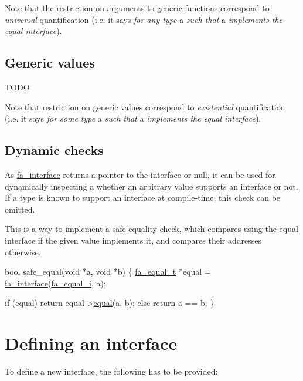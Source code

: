 Note that the restriction on arguments to generic functions correspond to {\itshape universal} quantification (i.\-e. it says {\itshape for any type} a {\itshape such that} a {\itshape implements the equal interface}).\hypertarget{md__interfaces_GenericPointers}{}\subsection{Generic values}\label{md__interfaces_GenericPointers}
T\-O\-D\-O

Note that restriction on generic values correspond to {\itshape existential} quantification (i.\-e. it says {\itshape for some type} a {\itshape such that} a {\itshape implements the equal interface}).\hypertarget{md__interfaces_DynInterfaceCheck}{}\subsection{Dynamic checks}\label{md__interfaces_DynInterfaceCheck}
As \hyperlink{group___fa_ga1cc4276643f3d366681ac7ff71fa8b06}{fa\-\_\-interface} returns a pointer to the interface or {\ttfamily null}, it can be used for dynamically inspecting a whether an arbitrary value supports an interface or not. If a type is known to support an interface at compile-\/time, this check can be omitted.

This is a way to implement a safe equality check, which compares using the equal interface if the given value implements it, and compares their addresses otherwise.


\begin{DoxyCode}
\textcolor{keywordtype}{bool} safe\_equal(\textcolor{keywordtype}{void} *a, \textcolor{keywordtype}{void} *b)
\{       
    \hyperlink{structfa__equal__t}{fa\_equal\_t} *equal = \hyperlink{group___fa_ga1cc4276643f3d366681ac7ff71fa8b06}{fa\_interface}(\hyperlink{interfaces_8h_a7c337b4de759549a84c656770ce01cd2a9b8bb278c9a713e6ec54d275002e0a01}{fa\_equal\_i}, a);

    \textcolor{keywordflow}{if} (equal)
        \textcolor{keywordflow}{return} equal->\hyperlink{structfa__equal__t_acd1ed940afe1760fc0246fb6e774445f}{equal}(a, b);
    \textcolor{keywordflow}{else}
        \textcolor{keywordflow}{return} a == b;
\}
\end{DoxyCode}
\hypertarget{md__interfaces_Defining}{}\section{Defining an interface}\label{md__interfaces_Defining}
To define a new interface, the following has to be provided\-:


